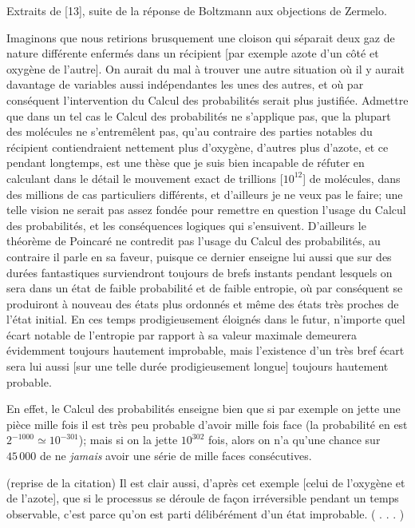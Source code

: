 Extraits de [13],  suite de la r\'eponse de Boltzmann aux objections 
de Zermelo. 
\medskip
{\cit  Imaginons que nous retirions brusquement une cloison qui s\'eparait
deux gaz de nature diff\'erente enferm\'es dans un r\'ecipient [par 
exemple azote d'un c\^ot\'e et oxyg\`ene de l'autre]. On aurait du mal \`a 
trouver une autre situation o\`u il y aurait davantage de variables aussi 
ind\'ependantes les unes des autres, et o\`u par cons\'equent  
l'intervention du Calcul des probabilit\'es serait plus justifi\'ee. 
Admettre que dans un tel cas le Calcul des probabilit\'es ne s'applique 
pas, que la plupart des mol\'ecules ne s'entrem\^elent pas, qu'au contraire 
des parties notables du r\'ecipient contiendraient nettement plus 
d'oxyg\`ene, d'autres plus d'azote, et ce pendant longtemps, est une 
th\`ese que je suis bien incapable de r\'efuter en calculant dans le 
d\'etail le mouvement exact de trillions [$10^{12}$] de mol\'ecules, dans 
des millions de cas particuliers diff\'erents, et d'ailleurs je ne veux 
pas le faire; une telle vision ne serait pas assez fond\'ee pour remettre 
en question l'usage du Calcul des probabilit\'es, et les cons\'equences 
logiques qui s'ensuivent. 
\smallskip
D'ailleurs le th\'eor\`eme de Poincar\'e ne contredit pas l'usage du Calcul 
des probabilit\'es, au contraire il parle en sa faveur, puisque ce 
dernier enseigne lui aussi que sur des dur\'ees fantastiques surviendront 
toujours de brefs instants pendant lesquels on sera dans un \'etat de 
faible probabilit\'e et de faible entropie, o\`u par 
cons\'equent se produiront \`a nouveau des \'etats plus ordonn\'es et m\^eme 
des \'etats tr\`es proches de l'\'etat initial. En ces temps prodigieusement 
\'eloign\'es dans le futur, n'importe quel \'ecart notable de l'entropie par 
rapport \`a sa valeur maximale demeurera \'evidemment toujours hautement 
improbable, mais l'existence d'un tr\`es bref \'ecart sera lui aussi 
[sur une telle dur\'ee prodigieusement longue] toujours hautement 
probable. \par}
\medskip
En effet, le Calcul des probabilit\'es enseigne bien que si par exemple 
on jette une pi\`ece mille fois il est tr\`es peu probable d'avoir mille 
fois face (la probabilit\'e en est $2^{-1000} \simeq 10^{-301}$); mais si 
on la jette $10^{302}$ fois, alors on n'a qu'une chance sur $45\, 000$ de 
ne {\it jamais} avoir une s\'erie de mille faces cons\'ecutives. 
\medskip
{\cit \noindent (reprise de la citation)\hskip12pt Il est clair aussi,
d'apr\`es cet exemple 
[celui de l'oxyg\`ene et de l'azote], que si le processus se d\'eroule 
de fa\c{c}on irr\'eversible pendant un temps observable, c'est parce 
qu'on est parti d\'elib\'er\'ement d'un \'etat improbable. ( . . . )
\smallskip
{} \par }

